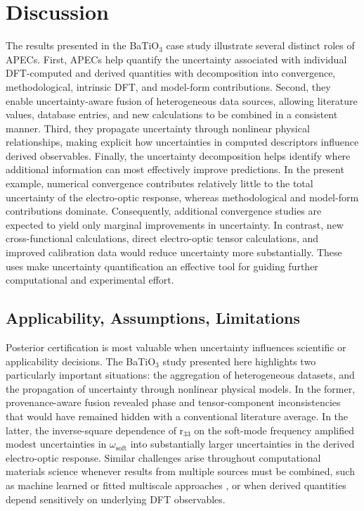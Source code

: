 \documentclass[prb,twocolumn,superscriptaddress,amsmath,amssymb,longbibliography]{revtex4-2}
\begin{document}



\section{Discussion}
\label{sec:discussion}

The results presented in the  BaTiO$_3$ case study illustrate several distinct roles of APECs. First, APECs help quantify the uncertainty associated with individual DFT-computed and derived quantities with decomposition into convergence, methodological, intrinsic DFT, and model-form contributions. 
Second, they enable uncertainty-aware fusion of heterogeneous data sources, allowing literature values, database entries, and new calculations to be combined in a consistent manner. 
Third, they propagate uncertainty through nonlinear physical relationships, making explicit how uncertainties in computed descriptors influence derived observables. 
Finally, the uncertainty decomposition helps identify where additional information can most effectively improve predictions. In the present example, numerical convergence contributes relatively little to the total uncertainty of the electro-optic response, whereas methodological and model-form contributions dominate. Consequently, additional convergence studies are expected to yield only marginal improvements in uncertainty. In contrast, new cross-functional calculations, direct electro-optic tensor calculations, and improved calibration data would reduce uncertainty more substantially. These uses make  uncertainty quantification  an effective tool for guiding further computational and experimental effort.

\subsection{Applicability, Assumptions, Limitations}

Posterior certification is most valuable when uncertainty influences scientific or applicability decisions. The BaTiO$_3$ study presented here highlights two particularly important situations: the aggregation of heterogeneous datasets, and the propagation of uncertainty through nonlinear physical models.  In the former, provenance-aware fusion revealed phase and tensor-component inconsistencies that would have remained hidden with a conventional literature average. In the latter, the inverse-square dependence of r$_{33}$ on the soft-mode frequency amplified modest uncertainties in  $\omega_{\text{soft}}$ into substantially larger uncertainties in the derived electro-optic response. Similar challenges arise throughout computational materials science whenever results from multiple sources must be combined, such as machine learned or fitted multiscale approaches \cite{Henderson2023}, or when derived quantities depend sensitively on underlying DFT observables. 
 
\end{document}
